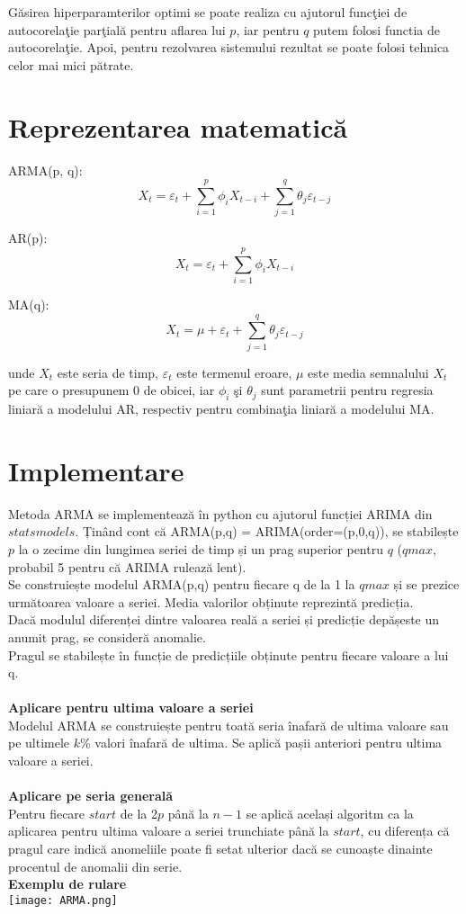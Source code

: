 Găsirea hiperparamterilor optimi se poate realiza cu ajutorul funcţiei de autocorelaţie parţială pentru aflarea lui $p$, iar pentru $q$ putem folosi
functia de autocorelaţie. Apoi, pentru rezolvarea sistemului rezultat se poate folosi tehnica celor mai mici pătrate.

\section{Reprezentarea matematică}

ARMA(p, q):
\[
X_t = \varepsilon_t + \sum_{i=1}^{p} \phi_i X_{t-i} + \sum_{j=1}^{q} \theta_j \varepsilon_{t-j}
\]

AR(p):
\[
X_t = \varepsilon_t + \sum_{i=1}^{p} \phi_i X_{t-i} 
\]

MA(q):
\[
X_t = \mu + \varepsilon_t + \sum_{j=1}^{q} \theta_j \varepsilon_{t-j}
\]

unde $X_t$ este seria de timp, $\varepsilon_t$ este termenul eroare, $\mu$ este media semnalului $X_t$ pe care o presupunem 0 de obicei, iar 
$\phi_i$ şi $\theta_j$ sunt parametrii pentru regresia liniară a modelului AR, respectiv pentru combinaţia liniară a modelului MA.

\section{Implementare}

\noindent Metoda ARMA se implementează în python cu ajutorul funcției ARIMA din $statsmodels$. Ținând cont că ARMA(p,q) = ARIMA(order=(p,0,q)), se stabilește $p$ la o zecime din lungimea seriei de timp și un prag superior pentru $q$ ($qmax$, probabil 5 pentru că ARIMA rulează lent).\\
Se construiește modelul ARMA(p,q) pentru fiecare q de la 1 la $qmax$ și se prezice următoarea valoare a seriei. Media valorilor obținute reprezintă predicția.\\
Dacă modulul diferenței dintre valoarea reală a seriei și predicție depășeste un anumit prag, se consideră anomalie.\\
Pragul se stabilește în funcție de predicțiile obținute pentru fiecare valoare a lui q.\\
\\
\textbf{Aplicare pentru ultima valoare a seriei}\\
Modelul ARMA se construiește pentru toată seria înafară de ultima valoare sau pe ultimele $k$\% valori înafară de ultima. Se aplică pașii anteriori pentru ultima valoare a seriei.\\
\\
\textbf{Aplicare pe seria generală}\\
Pentru fiecare $start$ de la 2$p$ până la $n-1$ se aplică același algoritm ca la aplicarea pentru ultima valoare a seriei trunchiate până la $start$, cu diferența că pragul care indică anomeliile poate fi setat ulterior dacă se cunoaște dinainte procentul de anomalii din serie.\\
\textbf{Exemplu de rulare}\\
\texttt{[image: ARMA.png]}